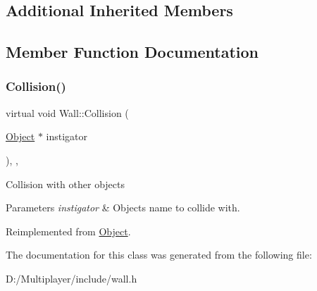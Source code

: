\subsection*{Additional Inherited Members}


\subsection{Member Function Documentation}
\mbox{\label{class_wall_a5a6c81f003e285ab96119d1aa983b82d}} 
\subsubsection{\texorpdfstring{Collision()}{Collision()}}
{\footnotesize\ttfamily virtual void Wall\+::\+Collision (\begin{DoxyParamCaption}\item[{\hyperlink{class_object}{Object} $\ast$}]{instigator }\end{DoxyParamCaption})\hspace{0.3cm}{\ttfamily [inline]}, {\ttfamily [override]}, {\ttfamily [virtual]}}

Collision with other objects 
\begin{DoxyParams}{Parameters}
{\em instigator} & Objects name to collide with. \\
\hline
\end{DoxyParams}


Reimplemented from \hyperlink{class_object_a0af60ea226dcb885e69483452d34a47a}{Object}.



The documentation for this class was generated from the following file\+:\begin{DoxyCompactItemize}
\item 
D\+:/\+Multiplayer/include/wall.\+h\end{DoxyCompactItemize}
